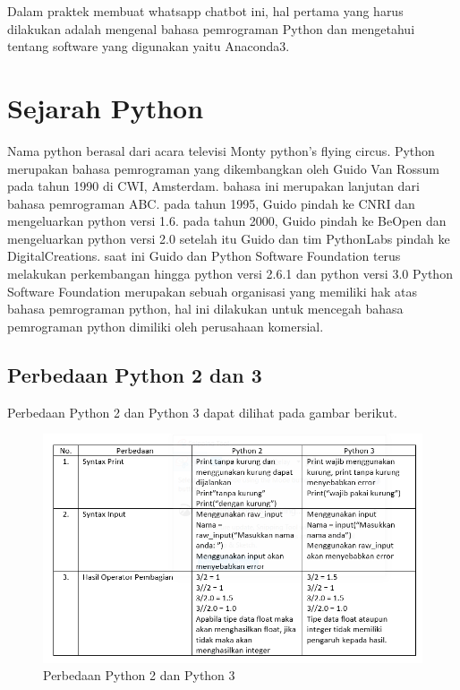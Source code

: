 Dalam praktek membuat whatsapp chatbot ini, hal pertama yang harus dilakukan adalah mengenal bahasa pemrograman Python dan mengetahui tentang software yang digunakan yaitu Anaconda3.

\section{Sejarah Python}
Nama python berasal dari acara televisi Monty python's flying circus. Python merupakan bahasa pemrograman yang dikembangkan oleh Guido Van Rossum pada tahun 1990 di CWI, Amsterdam. bahasa ini merupakan lanjutan dari bahasa pemrograman ABC. pada tahun 1995, Guido pindah ke CNRI dan mengeluarkan python versi 1.6. pada tahun 2000, Guido pindah ke BeOpen dan mengeluarkan python versi 2.0 setelah itu Guido dan tim PythonLabs pindah ke  DigitalCreations. saat ini Guido dan Python Software Foundation terus melakukan perkembangan hingga python versi 2.6.1 dan python versi 3.0
Python Software Foundation merupakan sebuah organisasi yang memiliki hak atas bahasa pemrograman python, hal ini dilakukan untuk mencegah bahasa pemrograman python dimiliki oleh perusahaan komersial.

\subsection{Perbedaan Python 2 dan 3}
Perbedaan Python 2 dan Python 3 dapat dilihat pada gambar berikut.
\begin{figure}[!htbp]
        \centerline{\includegraphics[scale=.75]{figures/perbedaan}}
        \caption{Perbedaan Python 2 dan Python 3}
		\label{perbedaan}
\end{figure}

